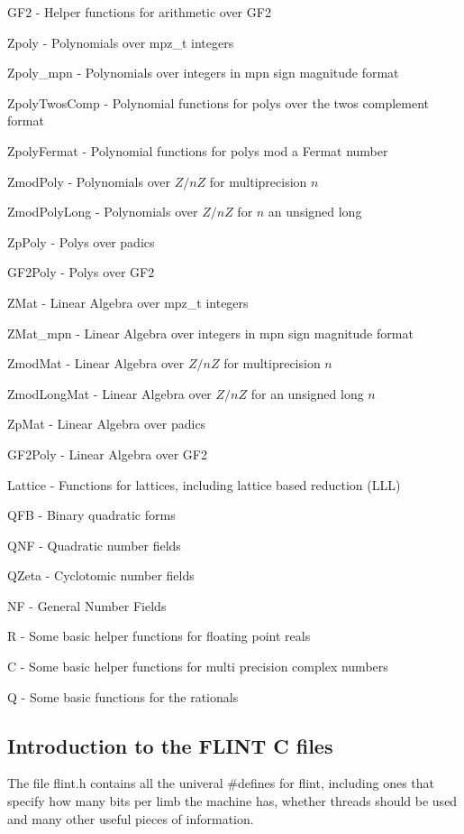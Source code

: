 \documentclass[a4paper,10pt]{article}
\begin{document}
GF2 - Helper functions for arithmetic over GF2

\vspace{5mm}

Zpoly - Polynomials over mpz\_t integers

Zpoly\_mpn - Polynomials over integers in mpn sign magnitude format

ZpolyTwosComp - Polynomial functions for polys over the twos complement format

ZpolyFermat - Polynomial functions for polys mod a Fermat number

ZmodPoly - Polynomials over $Z/nZ$ for multiprecision $n$

ZmodPolyLong - Polynomials over $Z/nZ$ for $n$ an unsigned long

ZpPoly - Polys over padics

GF2Poly - Polys over GF2

\vspace{5mm}

ZMat - Linear Algebra over mpz\_t integers

ZMat\_mpn - Linear Algebra over integers in mpn sign magnitude format

ZmodMat - Linear Algebra over $Z/nZ$ for multiprecision $n$

ZmodLongMat - Linear Algebra over $Z/nZ$ for an unsigned long $n$

ZpMat - Linear Algebra over padics

GF2Poly - Linear Algebra over GF2

\vspace{5mm}

Lattice - Functions for lattices, including lattice based reduction (LLL)

\vspace{5mm}

QFB - Binary quadratic forms

QNF - Quadratic number fields

QZeta - Cyclotomic number fields

NF - General Number Fields

\vspace{5mm}

R - Some basic helper functions for floating point reals

C - Some basic helper functions for multi precision complex numbers

Q - Some basic functions for the rationals

\subsection{Introduction to the FLINT C files}
The file flint.h contains all the univeral \#defines for flint, including ones that specify how many bits per limb the machine has, whether threads should be used and many other useful pieces of information.
\end{document}
